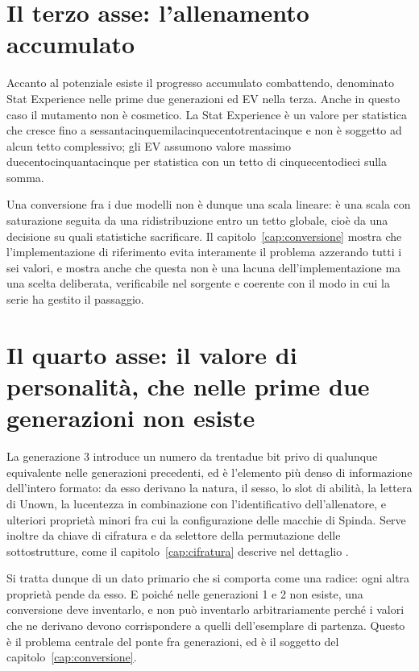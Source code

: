 \section{Il terzo asse: l'allenamento accumulato}

Accanto al potenziale esiste il progresso accumulato combattendo, denominato Stat Experience nelle prime due generazioni ed EV nella terza. Anche in questo caso il mutamento non è cosmetico. La Stat Experience è un valore per statistica che cresce fino a sessantacinquemilacinquecentotrentacinque e non è soggetto ad alcun tetto complessivo; gli EV assumono valore massimo duecentocinquantacinque per statistica con un tetto di cinquecentodieci sulla somma.

Una conversione fra i due modelli non è dunque una scala lineare: è una scala con saturazione seguita da una ridistribuzione entro un tetto globale, cioè da una decisione su quali statistiche sacrificare. Il capitolo~\ref{cap:conversione} mostra che l'implementazione di riferimento evita interamente il problema azzerando tutti i sei valori, e mostra anche che questa non è una lacuna dell'implementazione ma una scelta deliberata, verificabile nel sorgente e coerente con il modo in cui la serie ha gestito il passaggio.

\section{Il quarto asse: il valore di personalità, che nelle prime due generazioni non esiste}

La generazione 3 introduce un numero da trentadue bit privo di qualunque equivalente nelle generazioni precedenti, ed è l'elemento più denso di informazione dell'intero formato: da esso derivano la natura, il sesso, lo slot di abilità, la lettera di Unown, la lucentezza in combinazione con l'identificativo dell'allenatore, e ulteriori proprietà minori fra cui la configurazione delle macchie di Spinda. Serve inoltre da chiave di cifratura e da selettore della permutazione delle sottostrutture, come il capitolo~\ref{cap:cifratura} descrive nel dettaglio \cite{pokeemerald}.

Si tratta dunque di un dato primario che si comporta come una radice: ogni altra proprietà pende da esso. E poiché nelle generazioni 1 e 2 non esiste, una conversione deve inventarlo, e non può inventarlo arbitrariamente perché i valori che ne derivano devono corrispondere a quelli dell'esemplare di partenza. Questo è il problema centrale del ponte fra generazioni, ed è il soggetto del capitolo~\ref{cap:conversione}.


